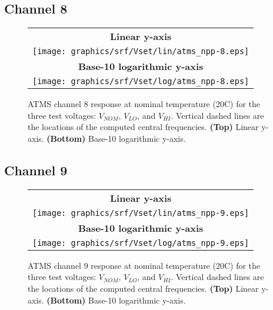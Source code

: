 \subsection{Channel 8}
\begin{figure}[H]
  \label{fig:Vset.ch8_response}
  \centering
  \begin{tabular}{c}
    \hspace{1.75cm}\sffamily\textbf{Linear y-axis} \\
    \texttt{[image: graphics/srf/Vset/lin/atms\_npp-8.eps]} \\
    \hspace{1.75cm}\sffamily\textbf{Base-10 logarithmic y-axis} \\
    \texttt{[image: graphics/srf/Vset/log/atms\_npp-8.eps]}
  \end{tabular}
  \caption{ATMS channel 8 response at nominal temperature (20\textdegree{}C) for the three test voltages: $V_{NOM}$, $V_{LO}$, and $V_{HI}$. Vertical dashed lines are the locations of the computed central frequencies. \textbf{(Top)} Linear y-axis. \textbf{(Bottom)} Base-10 logarithmic y-axis.}
\end{figure}

\subsection{Channel 9}
\begin{figure}[H]
  \label{fig:Vset.ch9_response}
  \centering
  \begin{tabular}{c}
    \hspace{1.75cm}\sffamily\textbf{Linear y-axis} \\
    \texttt{[image: graphics/srf/Vset/lin/atms\_npp-9.eps]} \\
    \hspace{1.75cm}\sffamily\textbf{Base-10 logarithmic y-axis} \\
    \texttt{[image: graphics/srf/Vset/log/atms\_npp-9.eps]}
  \end{tabular}
  \caption{ATMS channel 9 response at nominal temperature (20\textdegree{}C) for the three test voltages: $V_{NOM}$, $V_{LO}$, and $V_{HI}$. Vertical dashed lines are the locations of the computed central frequencies. \textbf{(Top)} Linear y-axis. \textbf{(Bottom)} Base-10 logarithmic y-axis.}
\end{figure}

